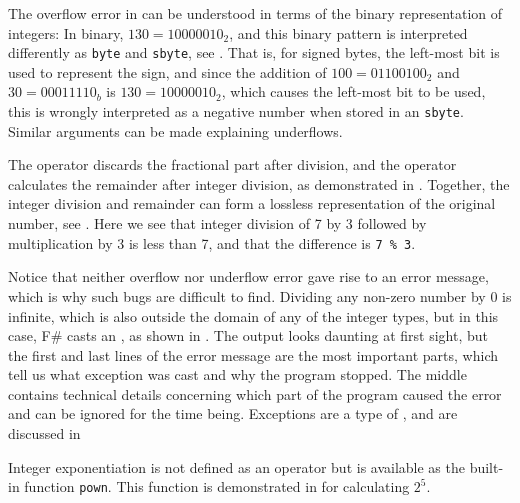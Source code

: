 \documentclass[springer.tex]{subfiles}
\begin{document}
The overflow error in  can be understood in terms of the binary representation of integers: In binary, $130=10000010_2$, and this binary pattern is interpreted differently as \lstinline{byte} and \lstinline{sbyte}, see .
%
%
That is, for signed bytes, the left-most bit is used to represent the sign, and since the addition of $100=01100100_2$ and $30=00011110_b$ is $130=10000010_2$, which causes the left-most bit to be used, this is wrongly interpreted as a negative number when stored in an \lstinline{sbyte}. Similar arguments can be made explaining underflows.

The  operator discards the fractional part after division, and the  operator calculates the remainder after integer division, as demonstrated in .
%
%
Together, the integer division and remainder can form a lossless representation of the original number, see .
%
%
Here we see that integer division of 7 by 3 followed by multiplication by 3 is less than 7, and that the difference is \lstinline!7 % 3!.

Notice that neither overflow nor underflow error gave rise to an error message, which is why such bugs are difficult to find. 
 Dividing any non-zero number by 0 is infinite, which is also outside the domain of any of the integer types, but in this case, F\# casts an , as shown in .
%
%
The output looks daunting at first sight, but the first and last lines of the error message are the most important parts, which tell us what exception was cast and why the program stopped. The middle contains technical details concerning which part of the program caused the error and can be ignored for the time being. Exceptions are a type of , and are discussed in 

Integer exponentiation is not defined as an operator but is available as the built-in function \lstinline|pown|. This function is demonstrated in  for calculating $2^5$.
%
%
\end{document}
